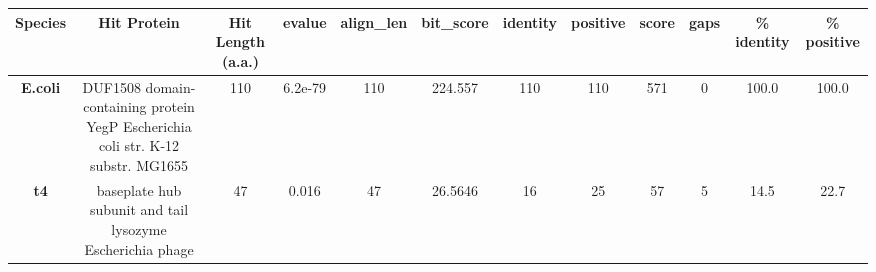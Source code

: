 \begin{tabular}{|c|c|c|c|c|c|c|c|c|c|c|c|} \hline
\textbf{Species} & \textbf{Hit Protein} & \textbf{Hit Length (a.a.)} & \textbf{evalue} & \textbf{align\_len} & \textbf{bit\_score} & \textbf{identity} & \textbf{positive} & \textbf{score} & \textbf{gaps} & \textbf{\% identity} & \textbf{\% positive} \\ \hline
\textbf{E.coli} & DUF1508 domain-containing protein YegP Escherichia coli str. K-12 substr. MG1655 & 110 & 6.2e-79 & 110 & 224.557 & 110 & 110 & 571 & 0 & 100.0 & 100.0\\
\textbf{t4} & baseplate hub subunit and tail lysozyme Escherichia phage  & 47 & 0.016 & 47 & 26.5646 & 16 & 25 & 57 & 5 & 14.5 & 22.7\\
\hline \end{tabular}
